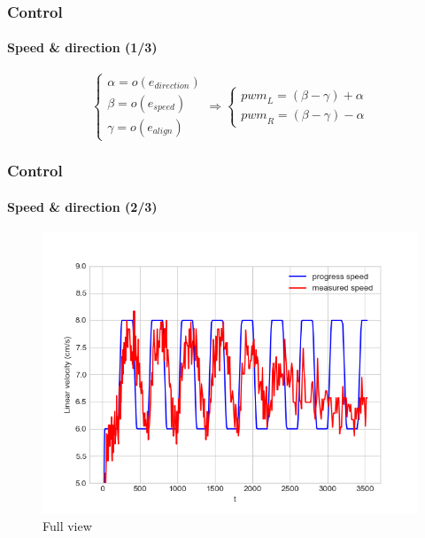 \documentclass{beamer}
\begin{document}

\begin{frame}
\frametitle{Control}
\framesubtitle{Speed \& direction (1/3)}
$$ 
\left\{
    \begin{array}{ll}
		\alpha = o(e_{direction}) \\[0.3cm]
		\beta = o(e_{speed}) \\[0.3cm]
		\gamma = o(e_{align})
	\end{array}
\right.
\Rightarrow
\left\{
    \begin{array}{ll}
		{pwm}_L =  (\beta -\gamma) + \alpha \\
		{pwm}_R = (\beta - \gamma) - \alpha
	\end{array}
\right.
$$
\end{frame}


\begin{frame}
\frametitle{Control}
\framesubtitle{Speed \& direction (2/3)}
\begin{figure}[hbtp]
\centering
\includegraphics[scale=0.4]{figures/pid_speed_normal.png}
\caption{Full view}
\end{figure}

\end{frame}

\end{document}
